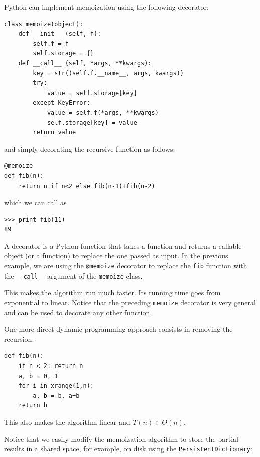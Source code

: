 \documentclass[justified,sixbynine]{tufte-book}
\def\ft{\small\tt}
\theoremstyle{plain}%
\theoremstyle{definition}
\theoremstyle{remark}
\begin{document}
\begin{fullwidth}

Python can implement memoization using the following decorator:
\begin{lstlisting}[caption={in file: {\ft nlib.py}}]
class memoize(object):
    def __init__ (self, f):
        self.f = f
        self.storage = {}
    def __call__ (self, *args, **kwargs):
        key = str((self.f.__name__, args, kwargs))
        try:
            value = self.storage[key]
        except KeyError:
            value = self.f(*args, **kwargs)
            self.storage[key] = value
        return value
\end{lstlisting}

and simply decorating the recursive function as follows:

\begin{lstlisting}[caption={in file: {\ft nlib.py}}]
@memoize
def fib(n):
    return n if n<2 else fib(n-1)+fib(n-2)
\end{lstlisting}

which we can call as

\begin{lstlisting}[caption={in file: {\ft nlib.py}}]
>>> print fib(11)
89
\end{lstlisting}

A decorator is a Python function that takes a function and returns a callable object (or a function) to replace the one passed as input. In the previous example, we are using the {\ft @memoize} decorator to replace the {\ft fib} function with the {\ft \_\_call\_\_} argument of the {\ft memoize} class.

This makes the algorithm run much faster. Its running time goes from exponential to linear. Notice that the preceding {\ft memoize} decorator is very general and can be used to decorate any other function.

One more direct
dynamic programming approach consists in removing the recursion:

\begin{lstlisting}
def fib(n):
    if n < 2: return n
    a, b = 0, 1
    for i in xrange(1,n):
        a, b = b, a+b
    return b
\end{lstlisting}

This also makes the algorithm linear and $T(n) \in \Theta(n)$.


Notice that we easily modify the memoization algorithm to store the partial results in a shared space, for example, on disk using the {\ft PersistentDictionary}:


\end{fullwidth}
\end{document}
